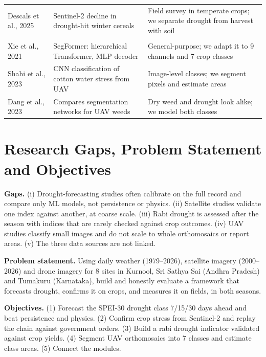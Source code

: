 \documentclass[11pt,a4paper,oneside]{article}
\begin{document}
{\begin{longtable}{@{}>{\raggedright\arraybackslash}p{3.3cm}>{\raggedright\arraybackslash}p{6.05cm}>{\raggedright\arraybackslash}p{6.05cm}@{}}
\nopagebreak
Descals et al., 2025~\cite{descals2025} & Sentinel-2 decline in drought-hit winter cereals & Field survey in temperate crops; we separate drought from harvest with soil \\
\multicolumn{3}{@{}l}{\textit{UAV}} \\
\nopagebreak
Xie et al., 2021~\cite{segformer2021} & SegFormer: hierarchical Transformer, MLP decoder & General-purpose; we adapt it to 9 channels and 7 crop classes \\
\nopagebreak
Shahi et al., 2023~\cite{shahi2023} & CNN classification of cotton water stress from UAV & Image-level classes; we segment pixels and estimate areas \\
\nopagebreak
Dang et al., 2023~\cite{dang2023} & Compares segmentation networks for UAV weeds & Dry weed and drought look alike; we model both classes \\
\end{longtable}}

\section{Research Gaps, Problem Statement and Objectives}
\textbf{Gaps.} (i) Drought-forecasting studies often calibrate on the full record and compare only ML models, not persistence or physics. (ii) Satellite studies validate one index against another, at coarse scale. (iii) Rabi drought is assessed after the season with indices that are rarely checked against crop outcomes. (iv) UAV studies classify small images and do not scale to whole orthomosaics or report areas. (v) The three data sources are not linked.

\textbf{Problem statement.} Using daily weather (1979--2026), satellite imagery (2000--2026) and drone imagery for 8 sites in Kurnool, Sri Sathya Sai (Andhra Pradesh) and Tumakuru (Karnataka), build and honestly evaluate a framework that forecasts drought, confirms it on crops, and measures it on fields, in both seasons.

\textbf{Objectives.} (1) Forecast the SPEI-30 drought class 7/15/30 days ahead and beat persistence and physics. (2) Confirm crop stress from Sentinel-2 and replay the chain against government orders. (3) Build a rabi drought indicator validated against crop yields. (4) Segment UAV orthomosaics into 7 classes and estimate class areas. (5) Connect the modules.

\end{document}
